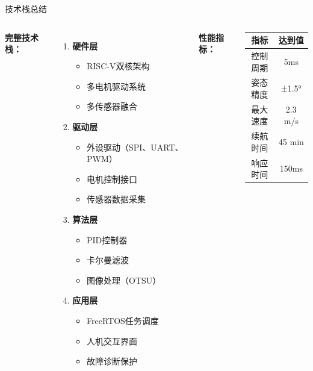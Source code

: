 \documentclass[aspectratio=169]{beamer}
\begin{document}
\begin{frame}{技术栈总结}
    \begin{columns}
        \textbf{完整技术栈：}
        
        \begin{enumerate}
            \item \textbf{硬件层}
            \begin{itemize}
                \item RISC-V双核架构
                \item 多电机驱动系统
                \item 多传感器融合
            \end{itemize}
            
            \item \textbf{驱动层}
            \begin{itemize}
                \item 外设驱动（SPI、UART、PWM）
                \item 电机控制接口
                \item 传感器数据采集
            \end{itemize}
            
            \item \textbf{算法层}
            \begin{itemize}
                \item PID控制器
                \item 卡尔曼滤波
                \item 图像处理（OTSU）
            \end{itemize}
            
            \item \textbf{应用层}
            \begin{itemize}
                \item FreeRTOS任务调度
                \item 人机交互界面
                \item 故障诊断保护
            \end{itemize}
        \end{enumerate}
        
        \textbf{性能指标：}
        
        \begin{center}
        \small
        \begin{tabular}{|c|c|}
        \hline
        \textbf{指标} & \textbf{达到值} \\
        \hline
        控制周期 & 5ms \\
        \hline
        姿态精度 & ±1.5° \\
        \hline
        最大速度 & 2.3 m/s \\
        \hline
        续航时间 & 45 min \\
        \hline
        响应时间 & 150ms \\
        \hline
        \end{tabular}
        \end{center}
        

\end{columns}
\end{frame}
\end{document}
